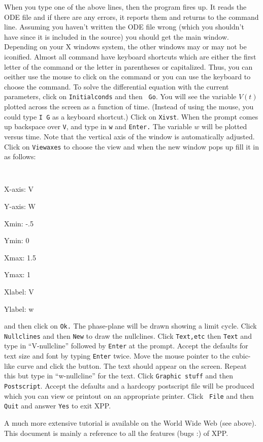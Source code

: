 \documentclass{article}
\begin{document}
When you type one of the above lines, then the program fires up. It
reads the ODE file and if there are any errors, it reports them and
returns to the command line.  Assuming you haven't written the ODE
file wrong (which you shouldn't have since it is included in the
source) you should get the main window.  Depending on your X windows
system, the other windows may or may not be iconified.  Almost all
command have keyboard shortcuts which are either the first letter of
the command or the letter in parentheses or capitalized. Thus, you can
oeither use the mouse to click on the command or you can use the
keyboard to choose the command.  To solve the differential equation
with the current parameters, click on {\tt Initialconds} and then {\tt
Go}. You will see the variable $V(t)$ plotted across the screen as a
function of time.  (Instead of using the mouse, you could type {\tt I
G} as a keyboard shortcut.)  Click on {\tt Xivst}.  When the prompt
comes up backspace over {\tt V}, and type in {\tt w} and {\tt Enter.}
The variable $w$ will be plotted versus time.  Note that the vertical
axis of the window is automatically adjusted.  Click on {\tt Viewaxes}
to choose the view and when the new window pops up fill it in as follows:
\begin{itemize} {\tt
\item X-axis: V
\item Y-axis: W
\item Xmin: -.5
\item Ymin: 0
\item Xmax: 1.5
\item Ymax: 1
\item Xlabel: V
\item Ylabel: w
}
\end{itemize}
and then click on {\tt Ok.}  The phase-plane will be drawn showing a
limit cycle. Click {\tt Nullclines} and then {\tt New} to draw the
nullclines. Click {\tt Text,etc} then {\tt Text} and type in
``V-nullcline'' followed by {\tt Enter} at the prompt.  Accept the
defaults for text size and font by typing {\tt Enter} twice.  Move the
mouse pointer to the cubic-like curve and click the button.  The text
should appear on the screen.  Repeat this but type in ``w-nullcline''
for the text.  Click {\tt Graphic stuff} and then {\tt Postscript}.
Accept the defaults and a hardcopy postscript file will be produced
which you can view or printout on an appropriate printer.  Click {\tt
File} and then {\tt Quit} and answer {\tt Yes} to exit XPP.

A much more extensive tutorial is available on the World Wide Web (see
above). This document is mainly a reference to all the features (bugs
:) of XPP.
\end{document}
